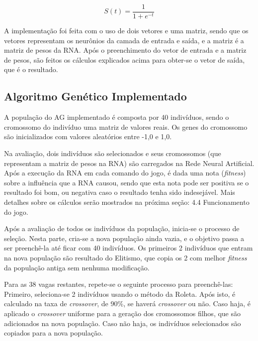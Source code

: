 \documentclass[12pt,a4paper]{article}
\begin{document}
	\begin{equation}
		S(t) = \frac{1}{1 + e^{-t}}
		\label{eq:sigmoid}
	\end{equation}
	
	\vspace{3mm}
	
	A implementação foi feita com o uso de dois vetores e uma matriz,
	sendo que os vetores representam os neurônios da camada de entrada e saída,
	e a matriz é a matriz de pesos da RNA.
	Após o preenchimento do vetor de entrada e a matriz de pesos,
	são feitos os cálculos explicados acima para obter-se o vetor de saída,
	que é o resultado.
	
	\FloatBarrier
	\subsection{Algoritmo Genético Implementado}
	A população do AG implementado é composta por 40 indivíduos,
	sendo o cromossomo do indivíduo uma matriz de valores reais.
	Os genes do cromossomo são inicializados com valores aleatórios entre -1,0 e 1,0.
	
	Na avaliação,
	dois indivíduos são selecionados e seus cromossomos
	(que representam a matriz de pesos na RNA)
	são carregados na Rede Neural Artificial.
	Após a execução da RNA em cada comando do jogo,
	é dada uma nota (\textit{fitness}) sobre a influência que a RNA causou,
	sendo que esta nota pode ser
	positiva se o resultado foi bom,
	ou negativa caso o resultado tenha sido indesejável.
	Mais detalhes sobre os cálculos serão mostrados na próxima seção:
	4.4 Funcionamento do jogo.
	
	Após a avaliação de todos os indivíduos da população,
	inicia-se o processo de seleção.
	Nesta parte, cria-se a nova população ainda vazia,
	e o objetivo passa a ser preenchê-la até ficar com 40 indivíduos.
	Os primeiros 2 indivíduos que entram na nova população são resultado do Elitismo,
	que copia os 2 com melhor \textit{fitness} da população antiga sem nenhuma modificação.
	
	Para as 38 vagas restantes,
	repete-se o seguinte processo para preenchê-las:
	Primeiro, seleciona-se 2 indivíduos usando o método da Roleta.
	Após isto, é calculado na taxa de \textit{crossover}, de 90\%, se haverá \textit{crossover} ou não.
	Caso haja, é aplicado o \textit{crossover} uniforme para a geração dos cromossomos filhos,
	que são adicionados na nova população.
	Caso não haja, os indivíduos selecionados são copiados para a nova população.
	
\end{document}
